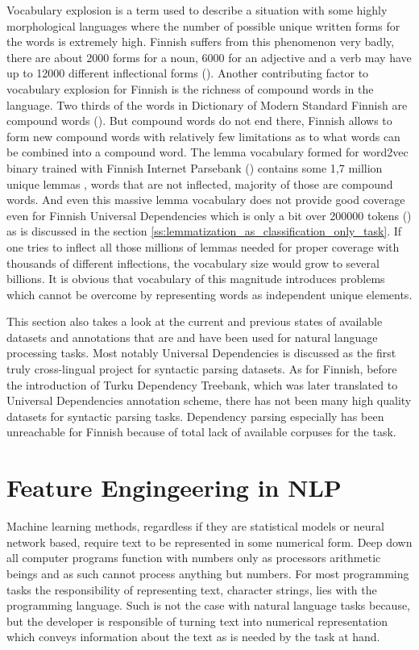 \documentclass[12pt,a4paper,english
]{tutthesis}
\begin{document}
Vocabulary explosion is a term used to describe a situation with some highly morphological languages where the number of possible unique written forms for the words is extremely high. Finnish suffers from this phenomenon very badly, there are about 2000 forms for a noun, 6000 for an adjective and a verb may have up to 12000 different inflectional forms (\cite{Korenius2004}). Another contributing factor to vocabulary explosion for Finnish is the richness of compound words in the language. Two thirds of the words in Dictionary of Modern Standard Finnish are compound words (\cite{Korenius2004}). But compound words do not end there, Finnish allows to form new compound words with relatively few limitations as to what words can be combined into a compound word. The lemma vocabulary formed for word2vec binary trained with Finnish Internet Parsebank (\cite{Kanerva2014}) contains some 1,7 million unique lemmas , words that are not inflected, majority of those are compound words. And even this massive lemma vocabulary does not provide good coverage even for Finnish Universal Dependencies which is only a bit over 200000 tokens (\cite{Haverinen2014}) as is discussed in the section \ref{ss:lemmatization_as_classification_only_task}. If one tries to inflect all those millions of lemmas needed for proper coverage with thousands of different inflections, the vocabulary size would grow to several billions. It is obvious that vocabulary of this magnitude introduces problems which cannot be overcome by representing words as independent unique elements.

This section also takes a look at the current and previous states of available datasets and annotations that are and have been used for natural language processing tasks. Most notably Universal Dependencies is discussed as the first truly cross-lingual project for syntactic parsing datasets. As for Finnish, before the introduction of Turku Dependency Treebank, which was later translated to Universal Dependencies annotation scheme, there has not been many high quality datasets for syntactic parsing tasks. Dependency parsing especially has been unreachable for Finnish because of total lack of available corpuses for the task.

\section{Feature Engingeering in NLP}
\label{ch:feature_engineering_in_nlp}
Machine learning methods, regardless if they are statistical models or neural network based, require text to be represented in some numerical form. Deep down all computer programs function with numbers only as processors arithmetic beings and as such cannot process anything but numbers. For most programming tasks the responsibility of representing text, character strings, lies with the programming language. Such is not the case with natural language tasks because, but the developer is responsible of turning text into numerical representation which conveys information about the text as is needed by the task at hand.
\end{document}

